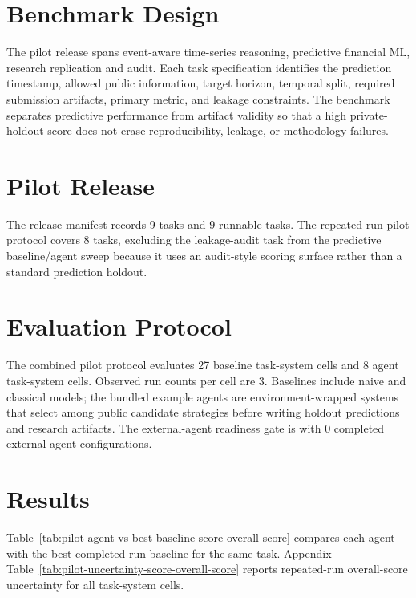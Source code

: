 \documentclass[11pt]{article}
\begin{document}


\section{Benchmark Design}
The pilot release spans event-aware time-series reasoning, predictive financial ML, research replication and audit. Each task specification identifies the prediction timestamp, allowed public information, target horizon, temporal split, required submission artifacts, primary metric, and leakage constraints. The benchmark separates predictive performance from artifact validity so that a high private-holdout score does not erase reproducibility, leakage, or methodology failures.

\section{Pilot Release}
The release manifest records 9 tasks and 9 runnable tasks. The repeated-run pilot protocol covers 8 tasks, excluding the leakage-audit task from the predictive baseline/agent sweep because it uses an audit-style scoring surface rather than a standard prediction holdout.

\section{Evaluation Protocol}
The combined pilot protocol evaluates 27 baseline task-system cells and 8 agent task-system cells. Observed run counts per cell are 3. Baselines include naive and classical models; the bundled example agents are environment-wrapped systems that select among public candidate strategies before writing holdout predictions and research artifacts. The external-agent readiness gate is  with 0 completed external agent configurations.



\section{Results}
Table~\ref{tab:pilot-agent-vs-best-baseline-score-overall-score} compares each agent with the best completed-run baseline for the same task. Appendix Table~\ref{tab:pilot-uncertainty-score-overall-score} reports repeated-run overall-score uncertainty for all task-system cells.


\end{document}
